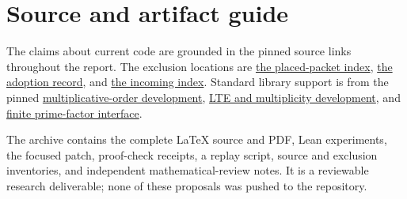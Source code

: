 \documentclass[11pt,letterpaper]{article}
\newcommand{\repobase}{https://github.com/VladimirReshetnikov/ProveIt/blob/9f35798db4a63c25e435fca14d75931144657d7e}
\begin{document}
\section{Source and artifact guide}

The claims about current code are grounded in the pinned source links
throughout the report. The exclusion locations are
\href{\repobase/Computability/DiophantineConsistency/research/lean-proof-simplification/README.md}{the placed-packet index},
\href{\repobase/Computability/DiophantineConsistency/research/lean-proof-simplification/ADOPTION.md}{the adoption record}, and
\href{\repobase/docs/incoming/README.md}{the incoming index}.
Standard library support is from the pinned
\href{https://github.com/leanprover-community/mathlib4/blob/81a5d257c8e410db227a6665ed08f64fea08e997/Mathlib/GroupTheory/OrderOfElement.lean}{multiplicative-order development},
\href{https://github.com/leanprover-community/mathlib4/blob/81a5d257c8e410db227a6665ed08f64fea08e997/Mathlib/NumberTheory/Multiplicity.lean}{LTE and multiplicity development}, and
\href{https://github.com/leanprover-community/mathlib4/blob/81a5d257c8e410db227a6665ed08f64fea08e997/Mathlib/Data/Nat/PrimeFin.lean}{finite prime-factor interface}.

The archive contains the complete LaTeX source and PDF, Lean experiments,
the focused patch, proof-check receipts, a replay script, source and exclusion
inventories, and independent mathematical-review notes. It is a reviewable
research deliverable; none of these proposals was pushed to the repository.
\end{document}
